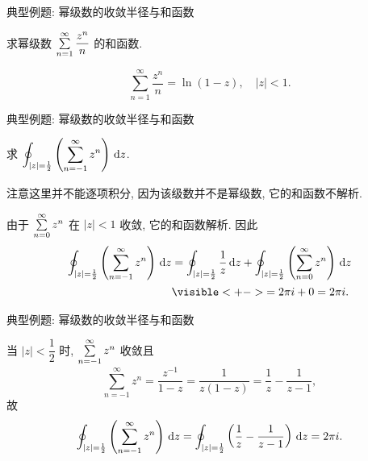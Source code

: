 \begin{frame}{典型例题: 幂级数的收敛半径与和函数}
\begin{exercise}
求幂级数 $\sum\limits_{n=1}^\infty\dfrac{z^n}n$ 的和函数.
\end{exercise}
\begin{answer}
\[\sum_{n=1}^\infty\frac{z^n}n=\ln(1-z),\quad|z|<1.\]
\end{answer}
\end{frame}


\begin{frame}{典型例题: 幂级数的收敛半径与和函数}
\begin{example}
求 $\displaystyle\oint_{|z|=\frac12}\left(\sum_{n=-1}^\infty z^n\right)\,\mathrm{d} z$.
\end{example}
\onslide<+->
注意这里并不能逐项积分, 因为该级数并不是幂级数, 它的和函数不解析.
\begin{solution}
由于 $\sum\limits_{n=0}^\infty z^n$ 在 $|z|<1$ 收敛,
\onslide<+->
它的和函数解析.
\onslide<+->
因此
\begin{align*}
\oint_{|z|=\frac12}\left(\sum_{n=-1}^\infty z^n\right)\diff z
	&=\oint_{|z|=\frac12}\frac1z\diff z+\oint_{|z|=\frac12}\left(\sum_{n=0}^\infty z^n\right)\diff z\\
&\visible<+->{=2\pi i+0=2\pi i.}
\end{align*}
\end{solution}
\end{frame}


\begin{frame}{典型例题: 幂级数的收敛半径与和函数}
\beqskip{3pt}
\begin{solution}[另解]
当 $|z|<\dfrac12$ 时, $\sum\limits_{n=-1}^\infty z^n$ 收敛且
\[\sum_{n=-1}^\infty z^n=\frac{z^{-1}}{1-z}=\frac1{z(1-z)}=\frac1z-\frac1{z-1},\]
\onslide<+->
故
\[\oint_{|z|=\frac12}\left(\sum_{n=-1}^\infty z^n\right)\,\mathrm{d} z
=\oint_{|z|=\frac12}\left(\frac1z-\frac1{z-1}\right)\,\mathrm{d} z=2\pi i.\]
\end{solution}
\endgroup
\end{frame}

